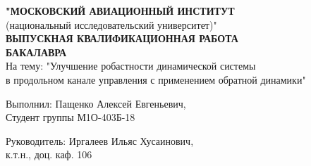 \begin{frame}
    \begin{center}
        \textbf{"МОСКОВСКИЙ АВИАЦИОННЫЙ ИНСТИТУТ } \\ (национальный исследовательский университет)" \\ 
        \textbf{ВЫПУСКНАЯ КВАЛИФИКАЦИОННАЯ РАБОТА \\ БАКАЛАВРА} \\ 
        На тему: "Улучшение робастности динамической системы \\ в продольном канале управления с применением обратной динамики"
    \end{center}
    \hfill \break
    Выполнил: Пащенко Алексей Евгеньевич, \\
    Студент группы М1О-403Б-18 \hfill \break

    Руководитель: Иргалеев Ильяс Хусаинович, \\ 
    к.т.н., доц. каф. 106
\end{frame}